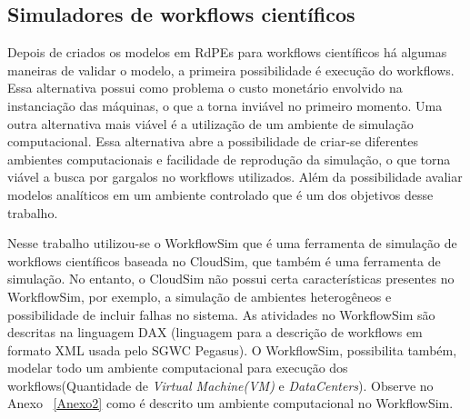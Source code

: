 	\subsection{Simuladores de workflows científicos}	
			
	Depois de criados os modelos em RdPEs para workflows científicos há algumas maneiras de validar o modelo, a primeira possibilidade é execução do workflows. Essa alternativa possui como problema o custo monetário envolvido na instanciação das máquinas, o que a torna inviável no primeiro momento. Uma outra alternativa mais viável é a  utilização de um ambiente de simulação computacional. Essa alternativa abre a possibilidade de criar-se diferentes ambientes computacionais e facilidade de reprodução da simulação, o que torna viável a busca por gargalos no workflows utilizados. Além da possibilidade avaliar modelos analíticos em um ambiente controlado que é um dos objetivos desse trabalho.
	
	Nesse trabalho utilizou-se o WorkflowSim\cite{chen:workflowsim} que é uma ferramenta de simulação de workflows científicos baseada no CloudSim\cite{google:cloudsim}, que também é uma ferramenta de simulação. No entanto, o CloudSim não possui certa características presentes no WorkflowSim, por exemplo, a simulação de ambientes heterogêneos e possibilidade de incluir falhas no sistema. As atividades no WorkflowSim  são descritas na linguagem DAX (linguagem para a descrição de workflows em formato XML usada pelo SGWC Pegasus). O WorkflowSim, possibilita também, modelar todo um ambiente computacional para execução dos workflows(Quantidade de \textit{Virtual Machine(VM)} e \textit{DataCenters}). Observe no Anexo ~\ref{Anexo2} como é descrito um ambiente computacional no WorkflowSim. 
							
				
